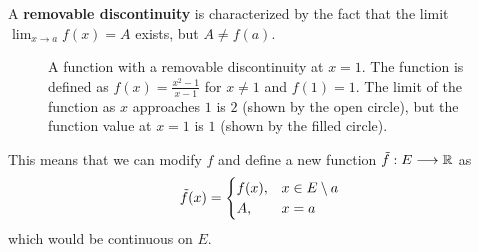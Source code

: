   \begin{definition}
    A \textbf{removable discontinuity} is characterized by the fact that the limit $\lim_{x \rightarrow a} f(x) = A$ exists, but $A \neq f(a)$. 

    \begin{figure}[H]
      \centering 
      \caption{A function with a removable discontinuity at $x=1$. The function is defined as $f(x) = \frac{x^2 - 1}{x - 1}$ for $x \neq 1$ and $f(1) = 1$. The limit of the function as $x$ approaches $1$ is $2$ (shown by the open circle), but the function value at $x=1$ is $1$ (shown by the filled circle).}
      \label{fig:removable-discontinuity}
    \end{figure}
  \end{definition}

  This means that we can modify $f$ and define a new function $\Tilde{f}: E \longrightarrow \mathbb{R}$ as
  \begin{equation}
    \Tilde{f}(x) = \begin{cases} f(x), & x \in E \setminus a \\ A, & x = a \end{cases}
  \end{equation}
  which would be continuous on $E$. 


